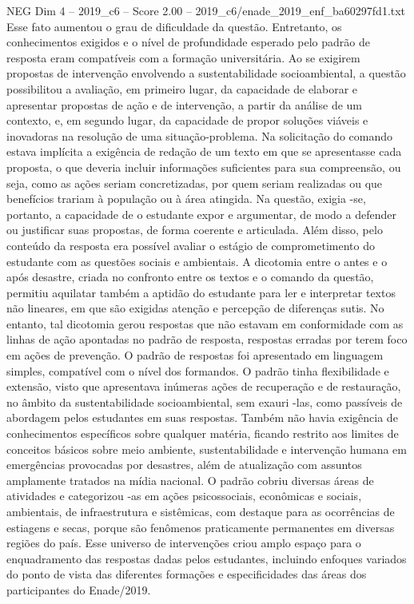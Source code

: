 \begin{textsample}{NEG Dim 4 – 2019\_c6 – Score 2.00 – 2019\_c6/enade\_2019\_enf\_ba60297fd1.txt}
Esse fato aumentou o grau de dificuldade da questão.
Entretanto, os conhecimentos exigidos e o nível de profundidade esperado pelo padrão de resposta eram compatíveis com a formação universitária.
Ao se exigirem propostas de intervenção envolvendo a sustentabilidade socioambiental, a questão possibilitou a avaliação, em primeiro lugar, da capacidade de elaborar e apresentar propostas de ação e de intervenção, a partir da análise de um contexto, e, em segundo lugar, da capacidade de propor soluções viáveis e inovadoras na resolução de uma situação-problema.
Na solicitação do comando estava implícita a exigência de redação de um texto em que se apresentasse cada proposta, o que deveria incluir informações suficientes para sua compreensão, ou seja, como as ações seriam concretizadas, por quem seriam realizadas ou que benefícios trariam à população ou à área atingida.
Na questão, exigia -se, portanto, a capacidade de o estudante expor e argumentar, de modo a defender ou justificar suas propostas, de forma coerente e articulada.
Além disso, pelo conteúdo da resposta era possível avaliar o estágio de comprometimento do estudante com as questões sociais e ambientais.
A dicotomia entre o antes e o após desastre, criada no confronto entre os textos e o comando da questão, permitiu aquilatar também a aptidão do estudante para ler e interpretar textos não lineares, em que são exigidas atenção e percepção de diferenças sutis.
No entanto, tal dicotomia gerou respostas que não estavam em conformidade com as linhas de ação apontadas no padrão de resposta, respostas erradas por terem foco em ações de prevenção.
O padrão de respostas foi apresentado em linguagem simples, compatível com o nível dos formandos.
O padrão tinha flexibilidade e extensão, visto que apresentava inúmeras ações de recuperação e de restauração, no âmbito da sustentabilidade socioambiental, sem exauri -las, como passíveis de abordagem pelos estudantes em suas respostas.
Também não havia exigência de conhecimentos específicos sobre qualquer matéria, ficando restrito aos limites de conceitos básicos sobre meio ambiente, sustentabilidade e intervenção humana em emergências provocadas por desastres, além de atualização com assuntos amplamente tratados na mídia nacional.
O padrão cobriu diversas áreas de atividades e categorizou -as em ações psicossociais, econômicas e sociais, ambientais, de infraestrutura e sistêmicas, com destaque para as ocorrências de estiagens e secas, porque são fenômenos praticamente permanentes em diversas regiões do país.
Esse universo de intervenções criou amplo espaço para o enquadramento das respostas dadas pelos estudantes, incluindo enfoques variados do ponto de vista das diferentes formações e especificidades das áreas dos participantes do Enade/2019.

\end{textsample}
